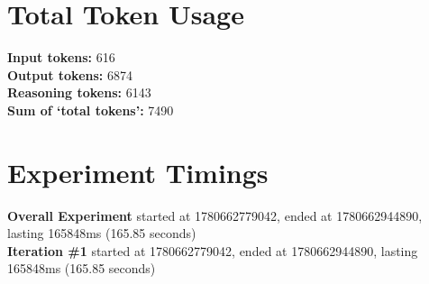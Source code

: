 \documentclass{article}
\begin{document}
\section*{Total Token Usage}
\textbf{Input tokens: }616
\\\textbf{Output tokens: }6874
\\\textbf{Reasoning tokens: }6143
\\\textbf{Sum of `total tokens': }7490
\section*{Experiment Timings}
\textbf{Overall Experiment} started at 1780662779042, ended at 1780662944890, lasting 165848ms (165.85 seconds)
\\\textbf{Iteration \#1} started at 1780662779042, ended at 1780662944890, lasting 165848ms (165.85 seconds)
\end{document}

